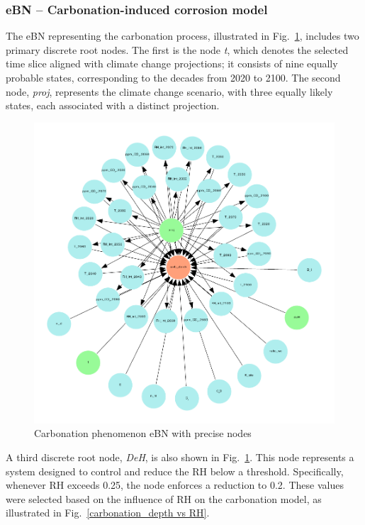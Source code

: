 \subsubsection{eBN -- Carbonation-induced corrosion model}\label{ebn_carbonation_section}
The eBN representing the carbonation process, illustrated in Fig.~\ref{carbonation_ebn}, includes two primary discrete root nodes. The first is the node \textit{t}, which denotes the selected time slice aligned with climate change projections; it consists of nine equally probable states, corresponding to the decades from 2020 to 2100. The second node, \textit{proj}, represents the climate change scenario, with three equally likely states, each associated with a distinct projection.
\begin{figure}[H]
    \centering
    \includegraphics[width=\linewidth]{imgs/pdfs/8_carb_ebn.pdf}
    \caption{Carbonation phenomenon eBN with precise nodes}\label{carbonation_ebn}
\end{figure}
A third discrete root node, \textit{DeH}, is also shown in Fig.~\ref{carbonation_ebn}. This node represents a system designed to control and reduce the RH below a threshold. Specifically, whenever RH exceeds 0.25, the node enforces a reduction to 0.2. These values were selected based on the influence of RH on the carbonation model, as illustrated in Fig.~\ref{carbonation_depth vs RH}.
